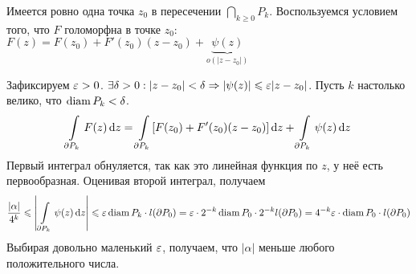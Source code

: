 \documentclass[a4paper]{report}
\begin{document}
{{    Имеется ровно одна точка $z_0$ в пересечении $\bigcap\limits_{k \ge 0}P_k$.
        Воспользуемся условием того, что $F$ голоморфна в точке $z_0$: $F(z) = F(z_0) + F'(z_0)(z - z_0) + \underbrace{\psi(z)}_{o(|z - z_0|)}$

    Зафиксируем $\varepsilon > 0$. $\exists \delta > 0: |z - z_0| < \delta \Rightarrow |\psi(z)| \leqslant \varepsilon|z - z_0|$.
        Пусть $k$ настолько велико, что $\operatorname{diam} P_k < \delta$.
    \[\int\limits_{\partial P_k}F(z)\operatorname{d}\! z = \int\limits_{\partial P_k}[F(z_0) + F'(z_0)(z -z_0)]\operatorname{d}\! z + \int\limits_{\partial P_k}\psi(z)\operatorname{d}\! z\]
    Первый интеграл обнуляется, так как это линейная функция по $z$, у неё есть первообразная.
        Оценивая второй интеграл, получаем \[\frac{|\alpha|}{4^k} \leqslant \left|\int\limits_{\,\partial P_k}\psi(z)\operatorname{d}\! z\right| \leqslant \varepsilon\operatorname{diam} P_k \cdot l(\partial P_0) = \varepsilon\cdot2^{-k}\operatorname{diam} P_0 \cdot 2^{-k}l(\partial P_0) = 4^{-k}\varepsilon \cdot \operatorname{diam} P_0 \cdot l(\partial P_0)\]
    Выбирая довольно маленький $\varepsilon$, получаем, что $|\alpha|$ меньше любого положительного числа.
    }
    }
\end{document}
